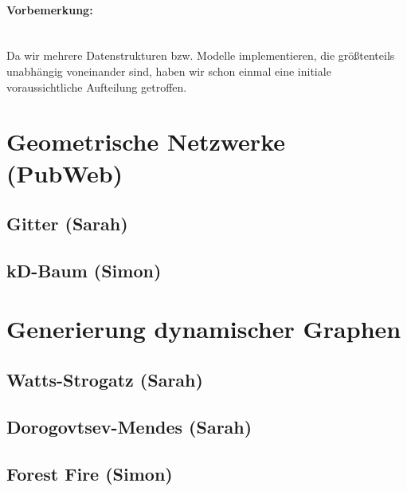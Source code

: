 \documentclass{scrartcl}
\begin{document}
\paragraph*{Vorbemerkung:}~\\
Da wir mehrere Datenstrukturen bzw. Modelle implementieren, die größtenteils unabhängig voneinander sind, haben wir schon einmal eine initiale voraussichtliche Aufteilung getroffen.
\section{Geometrische Netzwerke (PubWeb)}
\subsection{Gitter (Sarah)}

\subsection{kD-Baum (Simon)}

\section{Generierung dynamischer Graphen}
\subsection{Watts-Strogatz (Sarah)}

\subsection{Dorogovtsev-Mendes (Sarah)}

\subsection{Forest Fire (Simon)}
\end{document}
